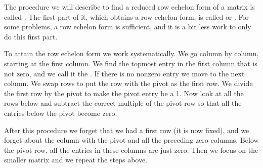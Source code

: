 The procedure we will describe to find a reduced row echelon form
of a matrix
is called \emph{}.
The first part of it, which obtains a row echelon form, is called
\emph{} or
\emph{}.  For some problems, a row echelon
form is sufficient, and it is a bit less work to only do this first part.

To attain the row echelon form we work systematically.
We go column by column, starting at the first column.  We find the topmost
entry in the first column that is not zero, and we call it the
\emph{}.  If there is no nonzero entry
we move to the next column.  We swap rows to put the row with
the pivot as the first row.  We divide the first row
by the pivot to make the pivot entry be a 1.  Now look at all the rows below
and subtract the correct multiple of the pivot row so that all the entries
below the pivot become zero.

After this procedure we forget that we had a first row (it is now fixed),
and we forget about the column with the pivot and all the preceding zero
columns.
Below the pivot row, all the entries in these columns are just
zero.  Then we focus on the smaller matrix and we repeat the steps
above.

